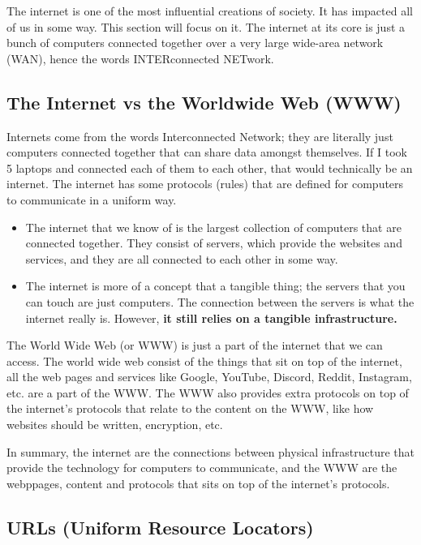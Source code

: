 \documentclass[../main.tex]{subfiles}
\begin{document}
The internet is one of the most influential creations of society. It has impacted all of us in some way. This section will focus on it. The internet at its core is just a bunch of computers connected together over a very large wide-area network (WAN), hence the words INTERconnected NETwork.

\subsection{The Internet vs the Worldwide Web (WWW)}

Internets come from the words Interconnected Network; they are literally just computers connected together that can share data amongst themselves. If I took 5 laptops and connected each of them to each other, that would technically be an internet. The internet has some protocols (rules) that are defined for computers to communicate in a uniform way.

\begin{itemize}
    \item The internet that we know of is the largest collection of computers that are connected together. They consist of servers, which provide the websites and services, and they are all connected to each other in some way.
    \item The internet is more of a concept that a tangible thing; the servers that you can touch are just computers. The connection between the servers is what the internet really is. However, \textbf{it still relies on a tangible infrastructure.}
\end{itemize}

The World Wide Web (or WWW) is just a part of the internet that we can access. The world wide web consist of the things that sit on top of the internet, all the web pages and services like Google, YouTube, Discord, Reddit, Instagram, etc. are a part of the WWW. The WWW also provides extra protocols on top of the internet's protocols that relate to the content on the WWW, like how websites should be written, encryption, etc.

In summary, the internet are the connections between physical infrastructure that provide the technology for computers to communicate, and the WWW are the webppages, content and protocols that sits on top of the internet's protocols.

\subsection{URLs (Uniform Resource Locators)}
\end{document}
